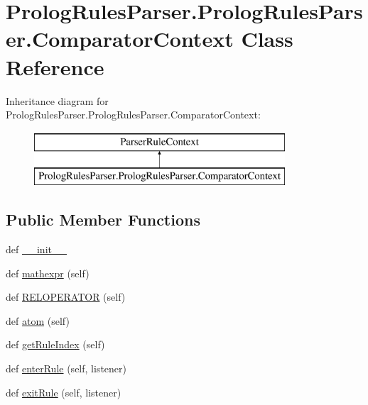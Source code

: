 \hypertarget{class_prolog_rules_parser_1_1_prolog_rules_parser_1_1_comparator_context}{}\section{Prolog\+Rules\+Parser.\+Prolog\+Rules\+Parser.\+Comparator\+Context Class Reference}
\label{class_prolog_rules_parser_1_1_prolog_rules_parser_1_1_comparator_context}
Inheritance diagram for Prolog\+Rules\+Parser.\+Prolog\+Rules\+Parser.\+Comparator\+Context\+:\begin{figure}[H]
\begin{center}
\leavevmode
\includegraphics[height=2.000000cm]{class_prolog_rules_parser_1_1_prolog_rules_parser_1_1_comparator_context}
\end{center}
\end{figure}
\subsection*{Public Member Functions}
\begin{DoxyCompactItemize}
\item 
def \hyperlink{class_prolog_rules_parser_1_1_prolog_rules_parser_1_1_comparator_context_a3fa1e3f0a849de47ff9c6cd4d3e62cc7}{\+\_\+\+\_\+init\+\_\+\+\_\+}
\item 
def \hyperlink{class_prolog_rules_parser_1_1_prolog_rules_parser_1_1_comparator_context_aac147d40792d5173f0d6581574929f5d}{mathexpr} (self)
\item 
def \hyperlink{class_prolog_rules_parser_1_1_prolog_rules_parser_1_1_comparator_context_ac1077a09906c3e53c18b6ca48db5b435}{R\+E\+L\+O\+P\+E\+R\+A\+T\+O\+R} (self)
\item 
def \hyperlink{class_prolog_rules_parser_1_1_prolog_rules_parser_1_1_comparator_context_a4632d209ecd5ff9e15d9941feab6f521}{atom} (self)
\item 
def \hyperlink{class_prolog_rules_parser_1_1_prolog_rules_parser_1_1_comparator_context_a21d1fa2b566f2f56dda09564a4091a75}{get\+Rule\+Index} (self)
\item 
def \hyperlink{class_prolog_rules_parser_1_1_prolog_rules_parser_1_1_comparator_context_ab3a7b87f4021da092f1102b1e89e6ced}{enter\+Rule} (self, listener)
\item 
def \hyperlink{class_prolog_rules_parser_1_1_prolog_rules_parser_1_1_comparator_context_aa3db6669684f178ae22e86b64422f960}{exit\+Rule} (self, listener)
\end{DoxyCompactItemize}
